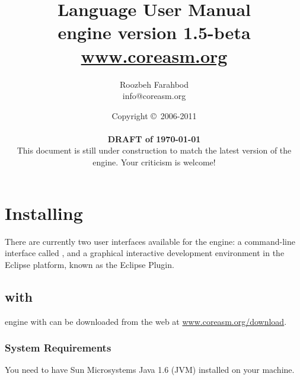\documentclass{article}
\newcommand{\version}{1.5-beta}
\newcommand{\copyrightNotice}[1]{{Copyright \copyright\ #1}}
\renewcommand{\url}[1]{\href{http://#1}{{\ttfamily #1}}}
\begin{document}
\title{\huge \CoreASM Language User Manual \\ {\Large engine version \version} \\ {\large \url{www.coreasm.org}}}

\author{Roozbeh Farahbod \\ \ttfamily info@coreasm.org} 

\date{\copyrightNotice{2006-2011} \\~\\ {\bf DRAFT of \today} \\ {This document is still under construction to match the latest version of the engine. Your criticism is welcome!}}

 \maketitle

\newpage
\tableofcontents
\newpage

\PScommands

\section{Installing \CoreASM}

There are currently two user interfaces available for the \CoreASM engine: a
command-line interface called \Carma, and a graphical interactive
development environment in the Eclipse platform, known as the \CoreASM Eclipse
Plugin.


\subsection{\CoreASM with \Carma}

\CoreASM engine with \Carma can be downloaded from the web at \url{www.coreasm.org/download}.


\subsubsection{System Requirements}

You need to have Sun Microsystems Java 1.6 (JVM) installed on your machine.
\end{document}
